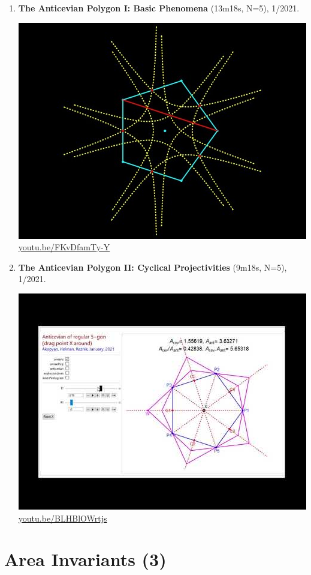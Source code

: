 \documentclass[12pt]{amsart}
\begin{document}
\begin{enumerate}[resume]
\item \textbf{The Anticevian Polygon I: Basic Phenomena} (13m18s, N=5), 1/2021. 
\begin{center}\includegraphics[width=.5\textwidth]{pics/FKvDfamTy-Y.jpg} \\ 
\href{https://youtu.be/FKvDfamTy-Y}{\url{youtu.be/FKvDfamTy-Y}}\end{center}
% 
\item \textbf{The Anticevian Polygon II: Cyclical Projectivities} (9m18s, N=5), 1/2021. 
\begin{center}\includegraphics[width=.5\textwidth]{pics/BLHBlOWrtjs.jpg} \\ 
\href{https://youtu.be/BLHBlOWrtjs}{\url{youtu.be/BLHBlOWrtjs}}\end{center}
% 
\end{enumerate}

\section{Area Invariants (3)}
\end{document}
